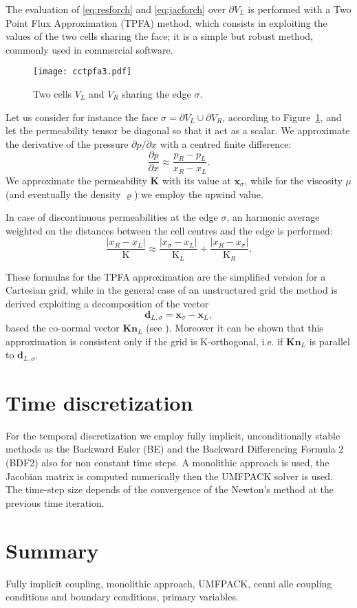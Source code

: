 The evaluation of \eqref{eq:resforch} and \eqref{eq:jacforch} over $\partial 
V_L$ is performed with a Two Point Flux Approximation (TPFA) method, which 
consists in exploiting the values of the two cells sharing the face; it is a 
simple but robust method, commonly used in commercial software.
\begin{figure}
	\centering
	\texttt{[image: cctpfa3.pdf]}
	\caption{Two cells $V_L$ and $V_R$ sharing the edge $\sigma$.}
	\label{fig:cctpfa}
\end{figure}
Let us consider for instance the face $\sigma = \partial V_L \cup \partial 
V_R$, according to Figure~\ref{fig:cctpfa}, and let the permeability tensor be 
diagonal so that it act as a scalar. We approximate the derivative of the 
pressure $\partial p /\partial 
x$ with a centred finite difference:
\begin{equation}
\frac{\partial p}{\partial x} \approx \frac{p_R-p_L}{x_R -x_L}.
\end{equation}
We approximate the permeability $\mathbf{K}$ with its value at 
$\mathbf{x}_\sigma$, while 
for the viscosity $\mu$ (and eventually the density $\varrho$) we employ the 
upwind value.

In case of discontinuous permeabilities at the edge $\sigma$, an harmonic 
average weighted on the distances between the cell centres and the edge is 
performed:
\begin{equation}
\frac{|x_R - x_L|}{\mathrm{K}} \approx 
\frac{|x_\sigma - x_L|}{\mathrm{K}_L}+\frac{|x_R - x_\sigma|}{\mathrm{K}_R}.
\end{equation}

These formulas for the TPFA approximation are the simplified version for a 
Cartesian grid, while in the general case of an unstructured grid the method is 
derived exploiting a decomposition of the vector
\begin{equation}
\mathbf{d}_{L,\sigma}=\mathbf{x}_\sigma - \mathbf{x}_L,
\end{equation}
based the co-normal vector $\mathbf{Kn}_L$ (see \cite{main:tpfa}). Moreover it 
can be shown that this approximation is consistent only if the grid is 
K-orthogonal, i.e. if $\mathbf{Kn}_L$ is parallel to $\mathbf{d}_{L, \sigma}$. 
\section{Time discretization}
For the temporal discretization we employ fully implicit, unconditionally 
stable methods as the Backward Euler (BE) and the Backward Differencing Formula 
2 (BDF2) also for non constant time steps. A monolithic approach is used, the 
Jacobian matrix is computed 
numerically then the UMFPACK solver is used. The time-step size depends of the 
convergence of the Newton's method at the previous time iteration.
\section{Summary}
Fully implicit coupling, monolithic approach, UMFPACK, cenni alle coupling 
conditions and boundary conditions, primary variables.
